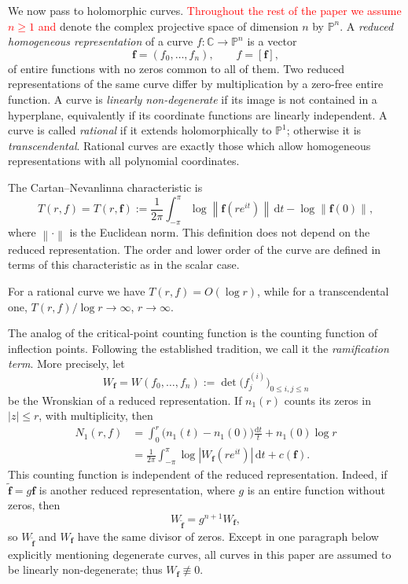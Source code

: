 \documentclass[12pt,letterpaper,reqno]{amsart}
\theoremstyle{definition}
\numberwithin{equation}{section}
\newcommand{\C}{\mathbb C}
\newcommand{\PP}{\mathbb P}
\newcommand{\norm}[1]{\left\lVert#1\right\rVert}
\newcommand{\fv}{\bm f}
\newcommand{\revision}[1]{\textcolor{red}{#1}}
\begin{document}
We now pass to holomorphic curves. \revision{Throughout the rest of the paper we
assume $n\geq1$ and} denote the complex projective space of dimension $n$ by
$\PP^n$. 
A \emph{reduced homogeneous representation} of a curve
$f:\C\to\PP^{n}$ is a vector
\[
 \fv=(f_0,\ldots,f_{n}),\qquad f=[\fv],
\]
of entire functions with no zeros common to all of them.
Two reduced representations of
the same curve differ by multiplication by a zero-free entire function.
A curve is \emph{linearly non-degenerate} if its image is not contained in
a hyperplane, equivalently if its coordinate functions are linearly
independent. A curve is called \emph{rational}
if it extends holomorphically to
$\PP^1$; otherwise it is \emph{transcendental}. Rational curves are exactly
those which allow homogeneous representations with all polynomial coordinates.

The Cartan--Nevanlinna characteristic is
\[
 T(r,f)=T(r,\fv):=
 \frac1{2\pi}\int_{-\pi}^{\pi}\log\norm{\fv(re^{it})}\,\mathrm dt
 -\log\norm{\fv(0)},
\]
where $\norm{\cdot}$ is the Euclidean norm. This definition does not
depend on the reduced representation. The order and lower order of the
curve are defined in terms of this characteristic as in the scalar case.

For a rational curve we have $T(r,f)=O(\log r)$, while for a transcendental
one,\newline
$T(r,f)/\log r\to\infty$, $r\to\infty$.

The analog of the critical-point counting function is the counting
function of inflection points. Following the established tradition,
we call it the \emph{ramification term}. More precisely, let
\[
 W_{\fv}=W(f_0,\ldots,f_{n})
 :=\det\bigl(f_j^{(i)}\bigr)_{0\leq i,j\le n}
\]
be the Wronskian of a reduced representation. If $n_1(r)$ counts its zeros
in $|z|\leq r$, with multiplicity, then
\[
 \begin{split}
 N_1(r,f)&=\int_0^r\bigl(n_1(t)-n_1(0)\bigr)\frac{\mathrm dt}{t}
                 +n_1(0)\log r\\
 &=\frac1{2\pi}\int_{-\pi}^{\pi}\log|W_{\fv}(re^{it})|\,\mathrm dt+c(\fv).
 \end{split}
\]
This counting function is independent of the reduced representation.
Indeed, if $\widetilde{\fv}=g\fv$ is another reduced representation,
where $g$ is an entire function without zeros, then
\[
W_{\widetilde{\fv}}=g^{n+1}W_{\fv},
\]
so $W_{\widetilde{\fv}}$ and $W_{\fv}$ have the same divisor of zeros.
Except in one paragraph below explicitly mentioning degenerate curves, all
curves in this paper are assumed to be linearly non-degenerate; thus
$W_{\fv}\not\equiv0$.
\end{document}
